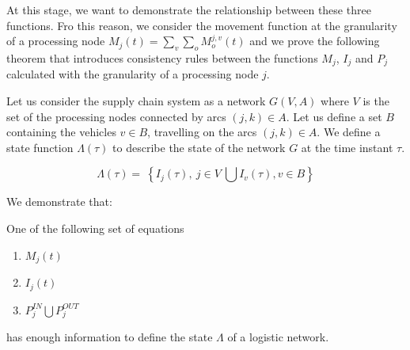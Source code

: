 At this stage, we want to demonstrate the relationship between these three functions. Fro this reason, we consider the movement function at the granularity of a processing node $M_j(t)=\sum_{v}\sum_{o}{M_o^{j,v}(t)}$  and we prove the following theorem that introduces consistency rules between the functions $M_j$, $I_j$ and $P_j$ calculated with the granularity of a processing node $j$. \par

Let us consider the supply chain system as a network $G(V,A)$ where $V$ is the set of the processing nodes connected by arcs $(j,k)\in A$. Let us define a set $B$ containing the vehicles $v\in B$, travelling on the arcs $(j,k)\in A$. We define a state function $\Lambda(\tau)$ to describe the state of the network $G$ at the time instant $\tau$.   


\begin{equation}
\Lambda\left(\tau\right)=\ \left\{I_j\left(\tau\right),\ j\in V\ \bigcup{I_v\left(\tau\right),v\in}B\right\}
\label{eq_stateLambda}
\end{equation}

We demonstrate that:

\begin{theorem} \label{theor_MIP}
One of the following set of equations 
\begin{enumerate}[label=(\roman*)]
    \item $M_j(t)$
    \item $I_j(t)$
    \item $P_j^{IN} \bigcup P_j^{OUT} $
\end{enumerate}
has enough information to define the state $\Lambda$ of a logistic network. 
\end{theorem}

